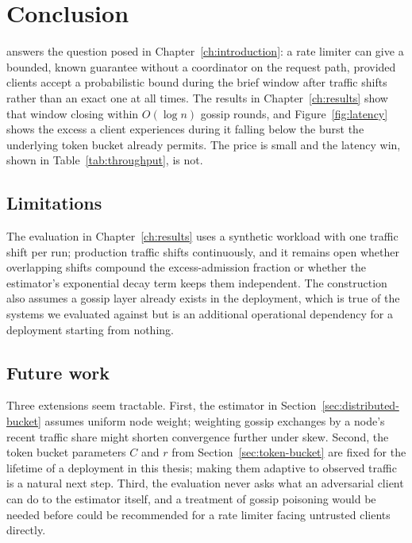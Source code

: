 \chapter{Conclusion}
\label{ch:conclusion}

\sysname{} answers the question posed in Chapter~\ref{ch:introduction}: a rate limiter can
give a bounded, known guarantee without a coordinator on the request path, provided clients
accept a probabilistic bound during the brief window after traffic shifts rather than an
exact one at all times. The results in Chapter~\ref{ch:results} show that window closing
within $O(\log n)$ gossip rounds, and Figure~\ref{fig:latency} shows the excess a client
experiences during it falling below the burst the underlying token bucket already permits.
The price is small and the latency win, shown in Table~\ref{tab:throughput}, is not.

\section{Limitations}

The evaluation in Chapter~\ref{ch:results} uses a synthetic workload with one traffic shift
per run; production traffic shifts continuously, and it remains open whether overlapping
shifts compound the excess-admission fraction or whether the estimator's exponential
decay term keeps them independent. The construction also assumes a gossip layer already
exists in the deployment, which is true of the systems we evaluated against but is an
additional operational dependency for a deployment starting from nothing.

\section{Future work}

Three extensions seem tractable. First, the estimator in
Section~\ref{sec:distributed-bucket} assumes uniform node weight; weighting gossip
exchanges by a node's recent traffic share might shorten convergence further under skew.
Second, the token bucket parameters $C$ and $r$ from Section~\ref{sec:token-bucket} are
fixed for the lifetime of a deployment in this thesis; making them adaptive to observed
traffic is a natural next step. Third, the evaluation never asks what an adversarial client
can do to the estimator itself, and a treatment of gossip poisoning would be needed before
\sysname{} could be recommended for a rate limiter facing untrusted clients directly.
